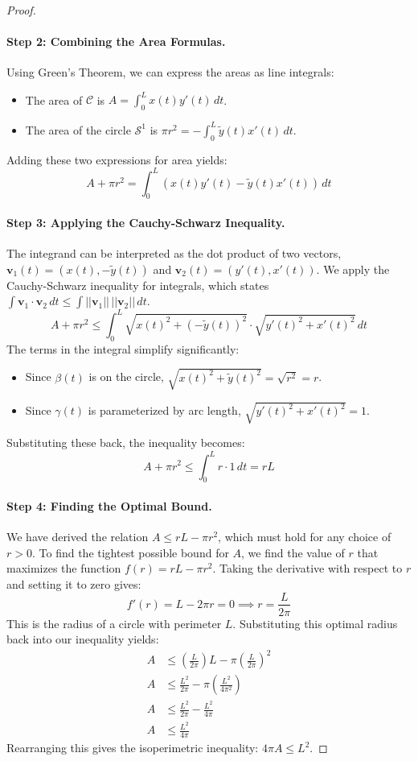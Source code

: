 \documentclass{article}
\begin{document}
\begin{proof}
\paragraph{Step 2: Combining the Area Formulas.}
Using Green's Theorem, we can express the areas as line integrals:
\begin{itemize}
    \item The area of $\mathcal{C}$ is $A = \int_0^L x(t)y'(t) \, dt$.
    \item The area of the circle $\mathcal{S}^1$ is $\pi r^2 = -\int_0^L \tilde{y}(t)x'(t) \, dt$.
\end{itemize}
Adding these two expressions for area yields:
\[ A + \pi r^2 = \int_0^L \left( x(t)y'(t) - \tilde{y}(t)x'(t) \right) \, dt \]

\paragraph{Step 3: Applying the Cauchy-Schwarz Inequality.}
The integrand can be interpreted as the dot product of two vectors, $\mathbf{v}_1(t) = (x(t), -\tilde{y}(t))$ and $\mathbf{v}_2(t) = (y'(t), x'(t))$. We apply the Cauchy-Schwarz inequality for integrals, which states $\int \mathbf{v}_1 \cdot \mathbf{v}_2 \, dt \le \int ||\mathbf{v}_1|| \, ||\mathbf{v}_2|| \, dt$.
\[ A + \pi r^2 \le \int_0^L \sqrt{x(t)^2 + (-\tilde{y}(t))^2} \cdot \sqrt{y'(t)^2 + x'(t)^2} \, dt \]
The terms in the integral simplify significantly:
\begin{itemize}
    \item Since $\beta(t)$ is on the circle, $\sqrt{x(t)^2 + \tilde{y}(t)^2} = \sqrt{r^2} = r$.
    \item Since $\gamma(t)$ is parameterized by arc length, $\sqrt{y'(t)^2 + x'(t)^2} = 1$.
\end{itemize}
Substituting these back, the inequality becomes:
\[ A + \pi r^2 \le \int_0^L r \cdot 1 \, dt = rL \]

\paragraph{Step 4: Finding the Optimal Bound.}
We have derived the relation $A \le rL - \pi r^2$, which must hold for any choice of $r > 0$. To find the tightest possible bound for $A$, we find the value of $r$ that maximizes the function $f(r) = rL - \pi r^2$. Taking the derivative with respect to $r$ and setting it to zero gives:
\[ f'(r) = L - 2\pi r = 0 \implies r = \frac{L}{2\pi} \]
This is the radius of a circle with perimeter $L$. Substituting this optimal radius back into our inequality yields:
\begin{align*}
    A &\le \left(\frac{L}{2\pi}\right)L - \pi\left(\frac{L}{2\pi}\right)^2 \\
    A &\le \frac{L^2}{2\pi} - \pi\left(\frac{L^2}{4\pi^2}\right) \\
    A &\le \frac{L^2}{2\pi} - \frac{L^2}{4\pi} \\
    A &\le \frac{L^2}{4\pi}
\end{align*}
Rearranging this gives the isoperimetric inequality: $4\pi A \le L^2$.


\end{proof}
\end{document}
